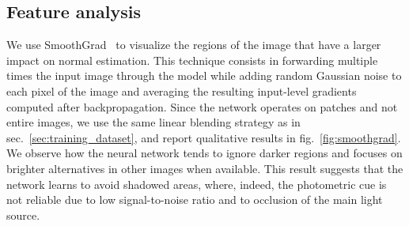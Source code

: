 \subsection{Feature analysis}

We use SmoothGrad~\cite{smilkov-arxiv-17} to visualize the regions of the image that have a larger impact on normal estimation. This technique consists in forwarding multiple times the input image through the model while adding random Gaussian noise to each pixel of the image and averaging the resulting input-level gradients computed after backpropagation. Since the network operates on patches and not entire images, we use the same linear blending strategy as in sec.~\ref{sec:training_dataset}, and report qualitative results in fig.~\ref{fig:smoothgrad}. We observe how the neural network tends to ignore darker regions and focuses on brighter alternatives in other images when available. This result suggests that the network learns to avoid shadowed areas, where, indeed, the photometric cue is not reliable due to low signal-to-noise ratio and to occlusion of the main light source.


